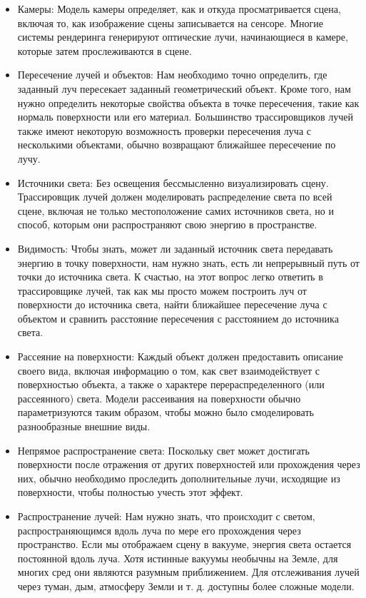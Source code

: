 \begin{itemize}
    \item Камеры: Модель камеры определяет, как и откуда просматривается сцена, включая то, как изображение сцены записывается на сенсоре. Многие системы рендеринга генерируют оптические лучи, начинающиеся в камере, которые затем прослеживаются в сцене.

    \item Пересечение лучей и объектов: Нам необходимо точно определить, где заданный луч пересекает заданный геометрический объект. Кроме того, нам нужно определить некоторые свойства объекта в точке пересечения, такие как нормаль поверхности или его материал. Большинство трассировщиков лучей также имеют некоторую возможность проверки пересечения луча с несколькими объектами, обычно возвращают ближайшее пересечение по лучу.

    \item Источники света: Без освещения бессмысленно визуализировать сцену. Трассировщик лучей должен моделировать распределение света по всей сцене, включая не только местоположение самих источников света, но и способ, которым они распространяют свою энергию в пространстве.

    \item Видимость: Чтобы знать, может ли заданный источник света передавать энергию в точку поверхности, нам нужно знать, есть ли непрерывный путь от точки до источника света. К счастью, на этот вопрос легко ответить в трассировщике лучей, так как мы просто можем построить луч от поверхности до источника света, найти ближайшее пересечение луча с объектом и сравнить расстояние пересечения с расстоянием до источника света.

    \item Рассеяние на поверхности: Каждый объект должен предоставить описание своего вида, включая информацию о том, как свет взаимодействует с поверхностью объекта, а также о характере перераспределенного (или рассеянного) света. Модели рассеивания на поверхности обычно параметризуются таким образом, чтобы можно было смоделировать разнообразные внешние виды.

    \item Непрямое распространение света: Поскольку свет может достигать поверхности после отражения от других поверхностей или прохождения через них, обычно необходимо проследить дополнительные лучи, исходящие из поверхности, чтобы полностью учесть этот эффект.

    \item Распространение лучей: Нам нужно знать, что происходит с светом, распространяющимся вдоль луча по мере его прохождения через пространство. Если мы отображаем сцену в вакууме, энергия света остается постоянной вдоль луча. Хотя истинные вакуумы необычны на Земле, для многих сред они являются разумным приближением. Для отслеживания лучей через туман, дым, атмосферу Земли и т. д. доступны более сложные модели.
\end{itemize}~\cite{PBRT3e}

